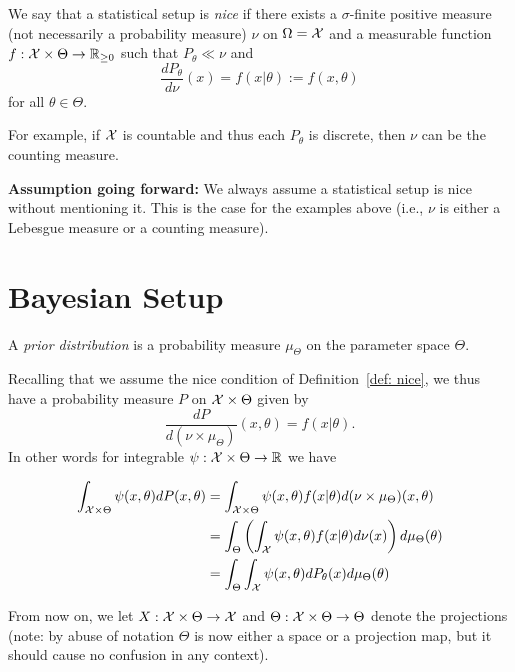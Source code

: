 \documentclass[twoside, a4paper, 10pt]{amsart}
\begin{document}
\begin{mydef} \label{def: nice} We say that a statistical setup is \textit{nice} if there exists a $\sigma$-finite positive measure (not necessarily a probability measure) $\nu$ on $\Omega = \mathcal{X}$ and a measurable function $f:\mathcal{X} \times \Theta \to \mathbb{R}_{\geq 0}$ such that $P_{\theta} \ll \nu$ and $$\frac{dP_{\theta}}{d\nu} (x) = f(x|\theta) := f(x, \theta)$$ for all $\theta \in \Theta$.

\end{mydef}

For example, if $\mathcal{X}$ is countable and thus each $P_{\theta}$ is discrete, then $\nu$ can be the counting measure.

\textbf{Assumption going forward:} We always assume a statistical setup is nice without mentioning it. This is the case for the examples above (i.e., $\nu$ is either a Lebesgue measure or a counting measure).

\section{Bayesian Setup}

\begin{mydef} A \textit{prior distribution} is a probability measure $\mu_{\Theta}$ on the parameter space $\Theta$. \end{mydef}

Recalling that we assume the nice condition of Definition~\ref{def: nice}, we thus have a probability measure $P$ on $\mathcal{X} \times \Theta$ given by $$\frac{dP}{d(\nu \times \mu_{\Theta})}(x,\theta) = f(x|\theta).$$ In other words for integrable $\psi:\mathcal{X} \times \Theta \to \mathbb{R}$ we have 

\begin{align*} \int_{\mathcal{X} \times \Theta} \psi(x,\theta) dP(x,\theta) &= \int_{\mathcal{X} \times \Theta } \psi(x,\theta) f(x|\theta) d(\nu \times \mu_{\Theta}) (x,\theta) \\ &= \int_{\Theta} \left( \int_{\mathcal{X}} \psi(x,\theta) f(x|\theta) d\nu(x) \right) d\mu_{\Theta}(\theta) \\
&=  \int_{\Theta} \int_{\mathcal{X}} \psi(x,\theta) dP_{\theta}(x) d\mu_{\Theta}(\theta)   \end{align*}

From now on, we let $X:\mathcal{X} \times \Theta \to \mathcal{X}$ and $\Theta:\mathcal{X} \times \Theta \to \Theta$ denote the projections (note: by abuse of notation $\Theta$ is now either a space or a projection map, but it should cause no confusion in any context).
\end{document}
